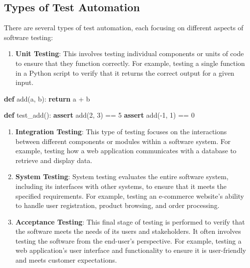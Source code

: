\documentclass[
  paper=a4,
  ,captions=tableheading
]{scrartcl}
\newenvironment{Shaded}{}{}
\newcommand{\ControlFlowTok}[1]{\textcolor[rgb]{0.00,0.44,0.13}{\textbf{#1}}}
\newcommand{\DecValTok}[1]{\textcolor[rgb]{0.25,0.63,0.44}{#1}}
\newcommand{\KeywordTok}[1]{\textcolor[rgb]{0.00,0.44,0.13}{\textbf{#1}}}
\newcommand{\NormalTok}[1]{#1}
\newcommand{\OperatorTok}[1]{\textcolor[rgb]{0.40,0.40,0.40}{#1}}
\providecommand{\tightlist}{%
  \setlength{\itemsep}{0pt}\setlength{\parskip}{0pt}}
\begin{document}
\hypertarget{types-of-test-automation}{%
\subsection{Types of Test Automation}\label{types-of-test-automation}}

There are several types of test automation, each focusing on different
aspects of software testing:

\begin{enumerate}
\def\labelenumi{\arabic{enumi}.}
\tightlist
\item
  \textbf{Unit Testing}: This involves testing individual components or
  units of code to ensure that they function correctly. For example,
  testing a single function in a Python script to verify that it returns
  the correct output for a given input.
\end{enumerate}

\begin{Shaded}
\begin{Highlighting}[]
\KeywordTok{def}\NormalTok{ add(a, b):}
    \ControlFlowTok{return}\NormalTok{ a }\OperatorTok{+}\NormalTok{ b}

\KeywordTok{def}\NormalTok{ test\_add():}
    \ControlFlowTok{assert}\NormalTok{ add(}\DecValTok{2}\NormalTok{, }\DecValTok{3}\NormalTok{) }\OperatorTok{==} \DecValTok{5}
    \ControlFlowTok{assert}\NormalTok{ add(}\OperatorTok{{-}}\DecValTok{1}\NormalTok{, }\DecValTok{1}\NormalTok{) }\OperatorTok{==} \DecValTok{0}
\end{Highlighting}
\end{Shaded}

\begin{enumerate}
\def\labelenumi{\arabic{enumi}.}
\item
  \textbf{Integration Testing}: This type of testing focuses on the
  interactions between different components or modules within a software
  system. For example, testing how a web application communicates with a
  database to retrieve and display data.
\item
  \textbf{System Testing}: System testing evaluates the entire software
  system, including its interfaces with other systems, to ensure that it
  meets the specified requirements. For example, testing an e-commerce
  website's ability to handle user registration, product browsing, and
  order processing.
\item
  \textbf{Acceptance Testing}: This final stage of testing is performed
  to verify that the software meets the needs of its users and
  stakeholders. It often involves testing the software from the
  end-user's perspective. For example, testing a web application's user
  interface and functionality to ensure it is user-friendly and meets
  customer expectations.
\end{enumerate}
\end{document}
